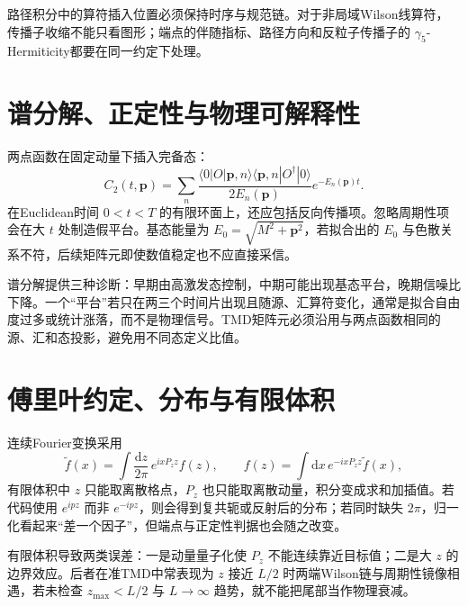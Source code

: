 \documentclass[UTF8,12pt,a4paper,twoside,openany]{ctexbook}
\newcommand{\dd}{\mathrm{d}}
\begin{document}
路径积分中的算符插入位置必须保持时序与规范链。对于非局域Wilson线算符，传播子收缩不能只看图形；端点的伴随指标、路径方向和反粒子传播子的 \(\gamma_5\)-Hermiticity都要在同一约定下处理。

\section{谱分解、正定性与物理可解释性}

两点函数在固定动量下插入完备态：
\begin{equation}
  C_2(t,\mathbf p)
  =\sum_n \frac{\langle 0|O|\mathbf p,n\rangle\langle\mathbf p,n|O^\dagger|0\rangle}{2E_n(\mathbf p)}
  e^{-E_n(\mathbf p)t}.
  \label{eq:toolbox-spectral}
\end{equation}
在Euclidean时间 \(0<t<T\) 的有限环面上，还应包括反向传播项。忽略周期性项会在大 \(t\) 处制造假平台。基态能量为 \(E_0=\sqrt{M^2+\mathbf p^2}\)，若拟合出的 \(E_0\) 与色散关系不符，后续矩阵元即使数值稳定也不应直接采信。

谱分解提供三种诊断：早期由高激发态控制，中期可能出现基态平台，晚期信噪比下降。一个“平台”若只在两三个时间片出现且随源、汇算符变化，通常是拟合自由度过多或统计涨落，而不是物理信号。TMD矩阵元必须沿用与两点函数相同的源、汇和态投影，避免用不同态定义比值。

\section{傅里叶约定、分布与有限体积}

连续Fourier变换采用
\begin{equation}
  \widetilde f(x)=\int\frac{\dd z}{2\pi}\,e^{ixP_zz}f(z),
  \qquad
  f(z)=\int\dd x\,e^{-ixP_zz}\widetilde f(x),
  \label{eq:toolbox-fourierconv}
\end{equation}
有限体积中 \(z\) 只能取离散格点，\(P_z\) 也只能取离散动量，积分变成求和加插值。若代码使用 \(e^{ipz}\) 而非 \(e^{-ipz}\)，则会得到复共轭或反射后的分布；若同时缺失 \(2\pi\)，归一化看起来“差一个因子”，但端点与正定性判据也会随之改变。

有限体积导致两类误差：一是动量量子化使 \(P_z\) 不能连续靠近目标值；二是大 \(z\) 的边界效应。后者在准TMD中常表现为 \(z\) 接近 \(L/2\) 时两端Wilson链与周期性镜像相遇，若未检查 \(z_{\max}<L/2\) 与 \(L\to\infty\) 趋势，就不能把尾部当作物理衰减。
\end{document}
